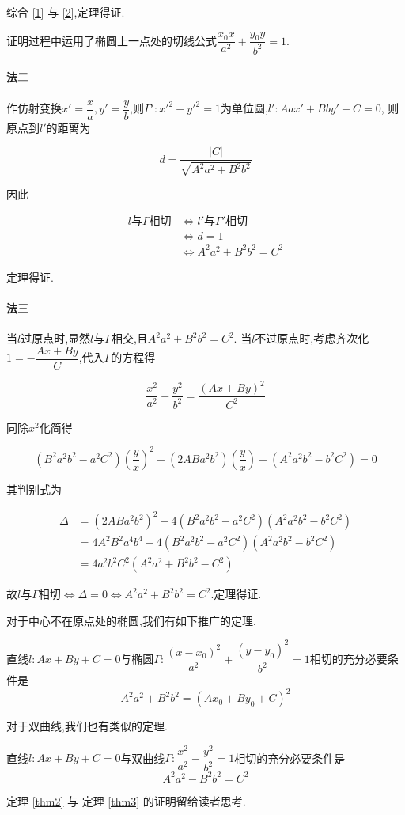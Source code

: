 \documentclass{article}
\begin{document}
综合 \ref{1} 与 \ref{2},定理得证.

\begin{rqq}
    证明过程中运用了椭圆上一点处的切线公式$\dfrac{x_0x}{a^2} + \dfrac{y_0y}{b^2} = 1$.
\end{rqq}

\paragraph{法二}

作仿射变换$x' = \dfrac{x}{a}, y' = \dfrac{y}{b}$,则$\Gamma': x'^2 + y'^2 = 1$为单位圆,$l': Aax' + Bby' + C = 0$,
则原点到$l'$的距离为

\[d = \dfrac{|C|}{\sqrt{A^2a^2 + B^2b^2}} \]

因此

\begin{align*}
    l \text{与} \Gamma \text{相切} & \iff l' \text{与} \Gamma' \text{相切} \\
    & \iff d = 1 \\
    & \iff A^2a^2 + B^2b^2 = C^2
\end{align*}

定理得证.

\paragraph{法三}

当$l$过原点时,显然$l$与$\Gamma$相交,且$A^2a^2 + B^2b^2 = C^2$.
当$l$不过原点时,考虑齐次化$1 = -\dfrac{Ax + By}{C}$,代入$\Gamma$的方程得

\[ \dfrac{x^2}{a^2} + \dfrac{y^2}{b^2} = \dfrac{(Ax + By)^2}{C^2} \]

同除$x^2$化简得

\[ (B^2a^2b^2 - a^2C^2) \left( \dfrac{y}{x} \right)^2 + (2ABa^2b^2) \left( \dfrac{y}{x} \right) + (A^2a^2b^2 - b^2C^2) = 0 \]

其判别式为

\begin{align*}
    \Delta & = (2ABa^2b^2)^2 - 4(B^2a^2b^2 - a^2C^2)(A^2a^2b^2 - b^2C^2) \\
    & = 4A^2B^2a^4b^4 - 4(B^2a^2b^2 - a^2C^2)(A^2a^2b^2 - b^2C^2) \\
    & = 4a^2b^2C^2(A^2a^2 + B^2b^2 - C^2)
\end{align*}

故$l$与$\Gamma$相切$\iff \Delta = 0 \iff A^2a^2 + B^2b^2 = C^2$.定理得证.

对于中心不在原点处的椭圆,我们有如下推广的定理.

\begin{thm} \label{thm2}
    直线$l: Ax + By + C = 0$与椭圆$\Gamma: \dfrac{(x - x_0)^2}{a^2} + \dfrac{(y - y_0)^2}{b^2} = 1$相切的充分必要条件是
    \[ A^2a^2 + B^2b^2 = (Ax_0 + By_0 + C)^2 \]
\end{thm}

对于双曲线,我们也有类似的定理.

\begin{thm} \label{thm3}
    直线$l: Ax + By + C = 0$与双曲线$\Gamma: \dfrac{x^2}{a^2} - \dfrac{y^2}{b^2} = 1$相切的充分必要条件是
    \[ A^2a^2 - B^2b^2 = C^2 \]
\end{thm}

定理 \ref{thm2} 与 定理 \ref{thm3} 的证明留给读者思考.
\end{document}
